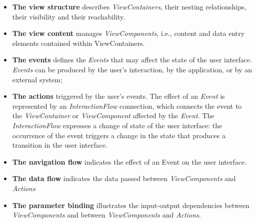 \begin{itemize}
  \item \textbf{The view structure} describes \textit{ViewContainers}, their nesting relationships, their visibility and their reachability.
    
  \item \textbf{The view content} manages \textit{ViewComponents}, i.e., content and data entry elements contained within ViewContainers.
  
  \item \textbf{The events} defines the \textit{Events} that may affect the state of the user interface. \textit{Events} can be produced by the user’s interaction, by the application, or by an external system; 

  \item \textbf{The actions} triggered by the user’s events. The effect of an \textit{Event} is represented by an \textit{InteractionFlow} connection, which connects the event to the \textit{ViewContainer} or \textit{ViewComponent} affected by the \textit{Event}. The \textit{InteractionFlow} expresses a change of state of the user interface: the occurrence of the event triggers a change in the state that produces a transition in the user interface.
  
  \item \textbf{The navigation flow} indicates the effect of an Event on the user interface.

  \item \textbf{The data flow} indicates the data passed between \textit{ViewComponents} and \textit{Actions}
  
  \item \textbf{The parameter binding} illustrates the input-output dependencies between \textit{ViewComponents} and between \textit{ViewComponents} and \textit{Actions}. 


\end{itemize} 

